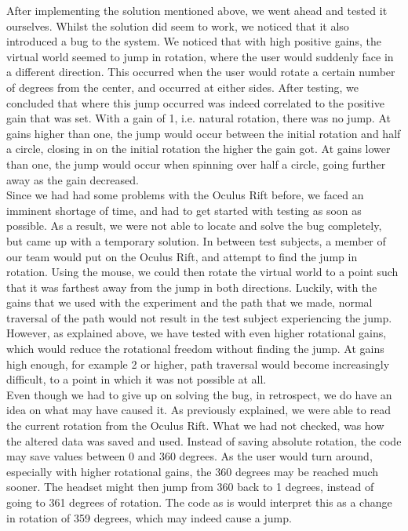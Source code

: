 After implementing the solution mentioned above, we went ahead and tested it ourselves.
Whilst the solution did seem to work, we noticed that it also introduced a bug to the system.
We noticed that with high positive gains, the virtual world seemed to jump in rotation, where the user would suddenly face in a different direction.
This occurred when the user would rotate a certain number of degrees from the center, and occurred at either sides.
After testing, we concluded that where this jump occurred was indeed correlated to the positive gain that was set.
With a gain of 1, i.e. natural rotation, there was no jump.
At gains higher than one, the jump would occur between the initial rotation and half a circle, closing in on the initial rotation the higher the gain got.
At gains lower than one, the jump would occur when spinning over half a circle, going further away as the gain decreased. \\
Since we had had some problems with the Oculus Rift before, we faced an imminent shortage of time, and had to get started with testing as soon as possible.
As a result, we were not able to locate and solve the bug completely, but came up with a temporary solution.
In between test subjects, a member of our team would put on the Oculus Rift, and attempt to find the jump in rotation.
Using the mouse, we could then rotate the virtual world to a point such that it was farthest away from the jump in both directions.
Luckily, with the gains that we used with the experiment and the path that we made, normal traversal of the path would not result in the test subject experiencing the jump.
However, as explained above, we have tested with even higher rotational gains, which would reduce the rotational freedom without finding the jump.
At gains high enough, for example 2 or higher, path traversal would become increasingly difficult, to a point in which it was not possible at all. \\
Even though we had to give up on solving the bug, in retrospect, we do have an idea on what may have caused it.
As previously explained, we were able to read the current rotation from the Oculus Rift.
What we had not checked, was how the altered data was saved and used.
Instead of saving absolute rotation, the code may save values between 0 and 360 degrees.
As the user would turn around, especially with higher rotational gains, the 360 degrees may be reached much sooner.
The headset might then jump from 360 back to 1 degrees, instead of going to 361 degrees of rotation.
The code as is would interpret this as a change in rotation of 359 degrees, which may indeed cause a jump.
